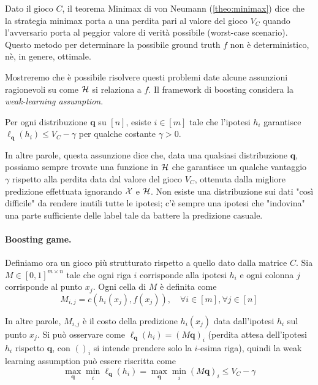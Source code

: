 Dato il gioco $C$, il teorema Minimax di von Neumann (\ref{theo:minimax}) dice che la strategia minimax porta a una perdita pari al valore del gioco $V_C$ quando l'avversario porta al peggior valore di verità possibile (worst-case scenario). Questo metodo per determinare la possibile ground truth $f$ non è deterministico, nè, in genere, ottimale.

Mostreremo che è possibile risolvere questi problemi date alcune assunzioni ragionevoli su come $\mathcal{H}$ si relaziona a $f$. Il framework di boosting considera la \textit{weak-learning assumption}. \\

\begin{assumption}
	\label{assumption:wl}
    Per ogni distribuzione $\bm q$ su $[n]$, esiste $i \in [m]$ tale che l'ipotesi $h_i$ garantisce $\ell_{\bm q}(h_i) \leq V_C - \gamma$ per qualche costante $\gamma > 0$.
\end{assumption}

In altre parole, questa assunzione dice che, data una qualsiasi distribuzione $\bm q$, possiamo sempre trovate una funzione in $\mathcal{H}$ che garantisce un qualche vantaggio $\gamma$ rispetto alla perdita data dal valore del gioco $V_C$, ottenuta dalla migliore predizione effettuata ignorando $\mathcal{X}$ e $\mathcal{H}$. Non esiste una distribuzione sui dati "così difficile" da rendere inutili tutte le ipotesi; c'è sempre una ipotesi che "indovina" una parte sufficiente delle label tale da battere la predizione casuale.

\paragraph{Boosting game.} Definiamo ora un gioco più strutturato rispetto a quello dato dalla matrice $C$. Sia $M \in [0,1]^{m \times n}$ tale che ogni riga $i$ corrisponde alla ipotesi $h_i$ e ogni colonna $j$ corrisponde al punto $x_j$. Ogni cella di $M$ è definita come
$$ M_{i,j} = c \left(h_i \left(x_j\right), f\left(x_j\right)\right), \quad \forall i \in [m], \forall j \in [n] $$

In altre parole, $M_{i,j}$ è il costo della predizione $h_i (x_j)$ data dall'ipotesi $h_i$ sul punto $x_j$. Si può osservare come $\ell_{\bm q} (h_i) = \left(M \bm q\right)_i$ (perdita attesa dell'ipotesi $h_i$ rispetto $\bm q$, con $()_i$ si intende prendere solo la $i$-esima riga), quindi la weak learning assumption può essere riscritta come
$$ \max_{\bm q} \min_i \ell_{\bm q} (h_i) = \max_{\bm q} \min_i \left(M \bm q\right)_i \leq V_C - \gamma $$

